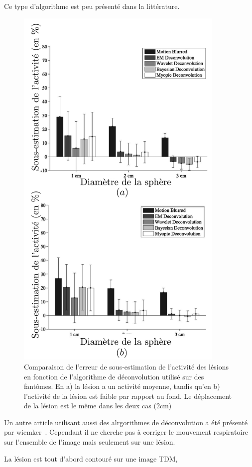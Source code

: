 Ce type d'algorithme est peu présenté dans la littérature. 

\begin{figure}[h!]
	\begin{center}
		\includegraphics[width=10cm]{images/performanceDeconvolution}
	\end{center}
	\caption{Comparaison de l'erreur de sous-estimation de l'activité des lésions en fonction de l'algorithme de déconvolution utilisé sur des fantômes. En a) la lésion a un activité moyenne, tandis qu'en b) l'activité de la lésion est faible par rapport au fond. Le déplacement de la lésion est le même dans les deux cas (2cm)} 
	\label{fig:performanceDeconvolution}
\end{figure}


Un autre article utilisant aussi des alrgorithmes de déconvolution a été présenté par wiemker~\cite{wiemker2008combined}. Cependant il ne cherche pas à corriger le mouvement respiratoire sur l'ensemble de l'image mais seulement sur une lésion. 

La lésion est tout d'abord contouré sur une image TDM, 

